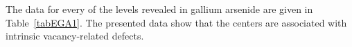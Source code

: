 \documentclass[final,3p,times,twocolumn,authoryear]{elsarticle}
\begin{document}









The data for every of the levels revealed in gallium arsenide are given in Table~\ref{tabEGA1}.
The presented data show that the centers are associated with intrinsic vacancy-related defects.


\pagebreak
\end{document}

